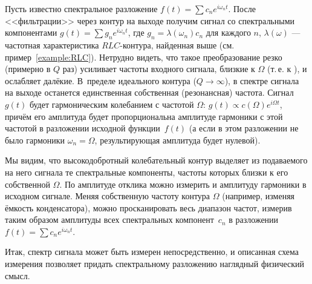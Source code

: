 Пусть известно спектральное разложение $f(t)=\sum c_n e^{i\omega_n t}$.
После <<фильтрации>> через контур на выходе получим сигнал со
спектральными компонентами $g(t)=\sum g_n e^{i\omega_n t}$,
где $g_n = \lambda(\omega_n) c_n$ для каждого $n$,
$\lambda(\omega)$ --- частотная характеристика $RLC$-контура, найденная
выше (см. пример~\ref{example:RLC}). Нетрудно видеть, что такое преобразование резко
(примерно в $Q$ раз) усиливает частоты входного сигнала, близкие к
$\Omega$ (т.\,е. к ), и ослабляет далёкие.
В~пределе идеального контура ($Q\to \infty$), в спектре сигнала на выходе
останется единственная собственная (резонансная) частота.
Сигнал $g(t)$ будет гармоническим колебанием с частотой $\Omega$:
$g(t) \propto c(\Omega) e^{i\Omega t}$,
причём его амплитуда будет пропорциональна амплитуде гармоники с этой
частотой в разложении исходной функции~$f(t)$ (а если в этом разложении не было
гармоники $\omega_n=\Omega$, результирующая амплитуда будет нулевой).

Мы видим, что высокодобротный колебательный контур 
выделяет из подаваемого
на него сигнала те спектральные компоненты, частоты которых близки к
его собственной $\Omega$. По амплитуде отклика можно измерить и амплитуду
гармоники в исходном сигнале. Меняя собственную частоту контура $\Omega$
(например, изменяя ёмкость конденсатора), можно просканировать весь
диапазон частот, измерив таким образом амплитуды всех спектральных
компонент~$c_n$ в разложении $f(t)=\sum c_n e^{i\omega_n t}$. 

Итак, спектр сигнала может быть измерен непосредственно, и описанная схема 
измерения позволяет придать спектральному разложению наглядный физический смысл.

